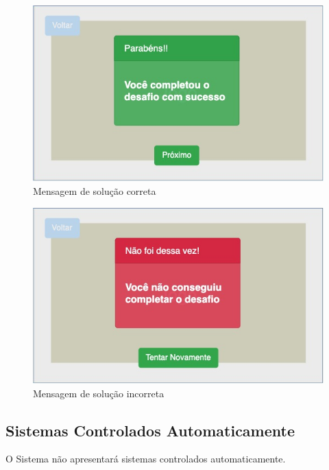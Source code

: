     \begin{figure}[H]
        \caption{Mensagem de solução correta}
        \begin{center}
            \includegraphics[width=\linewidth]{Imagens/cap3/solucao_correta.jpg}
        \end{center}
        \label{figura:solucao_correta}
    \end{figure}
    
    \begin{figure}[H]
        \caption{Mensagem de solução incorreta}
        \begin{center}
            \includegraphics[width=\linewidth]{Imagens/cap3/solucao_incorreta.jpg}
        \end{center}
        \label{figura:solucao_incorreta}
    \end{figure}
    
    
    \subsection{Sistemas Controlados Automaticamente}
    O Sistema não apresentará sistemas controlados automaticamente.
    
